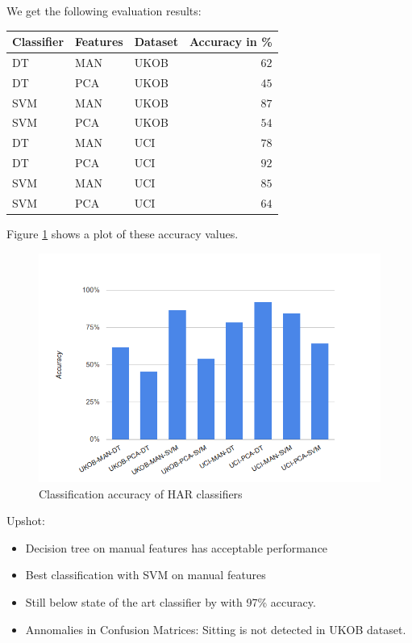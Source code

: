 We get the following evaluation results:
\begin{center}
\begin{tabular}{|lll|r|} \hline
  {\bf Classifier} & {\bf Features} & {\bf Dataset} & {\bf Accuracy in \%} \\ \hline
  DT	& MAN	& UKOB	&	$62$ \\ 
  DT	& PCA	& UKOB	&	$45$\\ 
  SVM	& MAN	& UKOB	&	$87$\\ 
  SVM	& PCA	& UKOB	&	$54$\\
  DT	& MAN	& UCI	&	$78$ \\ 
  DT	& PCA	& UCI	&	$92$ \\ 
  SVM	& MAN	& UCI	&	$85$ \\ 
  SVM	& PCA	& UCI	&	$64$ \\ \hline
\end{tabular}
\end{center}

Figure \ref{fig:har_eval} shows a plot of these accuracy values.

\begin{figure}[ht]
  \centering
  \includegraphics[width= 0.5 \textwidth]{img/har/accuracy_plot.png}
  \caption{Classification accuracy of HAR classifiers}
  \label{fig:har_eval}
\end{figure}


\pagebreak
{}

Upshot:
\begin{itemize}
\item  Decision tree on manual features has acceptable performance
\item  Best classification with SVM on manual features
\item  Still below state of the art classifier by \cite{Anguita} with 97\% accuracy.
\item  Annomalies in Confusion Matrices: Sitting is not detected in UKOB dataset.
\end{itemize}

